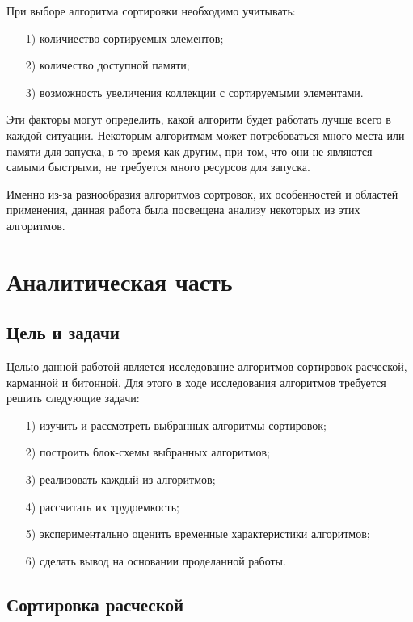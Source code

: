 \documentclass[12pt]{report}
\begin{document}
При выборе алгоритма сортировки необходимо учитывать: 
\begin{enumerate}
	\item[1)] количиество сортируемых элементов;
	\item[2)] количество доступной памяти;
	\item[3)] возможность увеличения коллекции с сортируемыми элементами.
\end{enumerate}
  

Эти факторы могут определить, какой алгоритм будет работать лучше всего в каждой ситуации. Некоторым алгоритмам может потребоваться много места или памяти для запуска, в то время как другим, при том, что они не являются самыми быстрыми, не требуется много ресурсов для запуска.

Именно из-за разнообразия алгоритмов сортровок, их особенностей и областей применения, данная работа была посвещена анализу некоторых из этих алгоритмов.
	
	
	

	
	\chapter{Аналитическая часть}
	
	\section{Цель и задачи}
	
	Целью данной работой является исследование алгоритмов сортировок расческой, карманной и битонной. Для этого в ходе исследования алгоритмов требуется решить следующие задачи:
	\begin{enumerate}
		\item[1)] изучить и рассмотреть выбранных алгоритмы сортировок;
		\item[2)] построить блок-схемы выбранных алгоритмов;
		\item[3)] реализовать каждый из алгоритмов;
		\item[4)] рассчитать их трудоемкость;
		\item[5)] экспериментально оценить временные характеристики алгоритмов;
		\item[6)] сделать вывод на основании проделанной работы.
	\end{enumerate}
	
	
	\section{Сортировка расческой}
	
\end{document}
